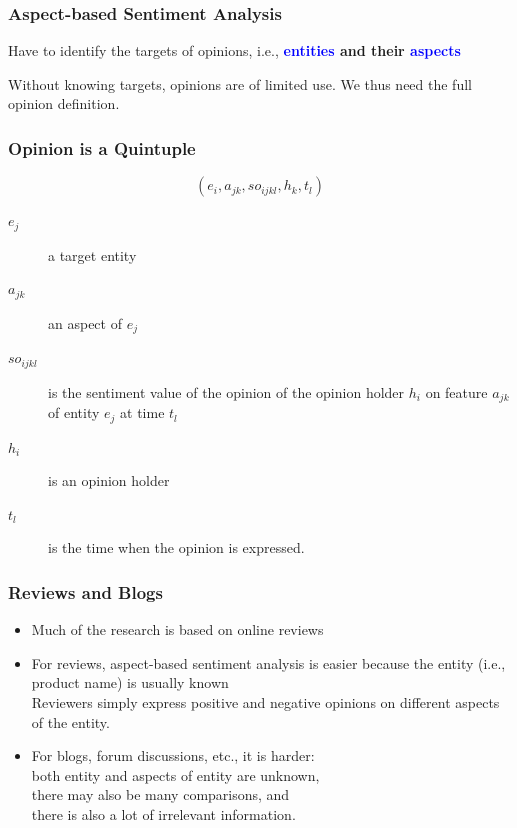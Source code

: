 \documentclass[t]{beamer}
\begin{document}
\begin{frame} \frametitle{Aspect-based Sentiment Analysis} %


\vfill
Have to identify the targets of opinions, i.e., \textbf{\textcolor{blue}{entities} and their \textcolor{blue}{aspects}} 

\vfill
Without knowing targets, opinions are of limited use. We thus need the full opinion definition.



\end{frame}

\begin{frame} \frametitle{Opinion is a Quintuple} %


\begin{equation*}
(e_i, a_{jk}, so_{ijkl}, h_k, t_l)     
\end{equation*}

\begin{description}
\item [$e_j$]  a target entity
\item [$a_{jk}$] an aspect of $e_j$
\item [$so_{ijkl}$]  is the sentiment value of the opinion of the opinion holder $h_i$ on feature $a_{jk}$ of entity $e_j$ at time $t_l$
\item [$h_i$] is an opinion holder
\item [$t_l$] is the time when the opinion is expressed. 
\end{description}



\end{frame}

\begin{frame} \frametitle{Reviews and Blogs} %
 
\begin{itemize}
\item  Much of the research is based on online reviews 
\item For reviews, aspect-based sentiment analysis is easier because
  the entity (i.e., product name) is usually known \\
Reviewers simply express positive and negative opinions on different aspects of the entity.

\item For blogs, forum discussions, etc., it is harder: \\
both entity and aspects of entity are unknown, \\
there may also be  many comparisons, and \\
there is also a lot of irrelevant information.

\end{itemize}

\end{frame}
\end{document}
